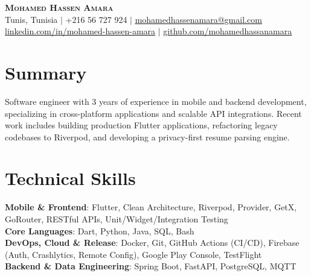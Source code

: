 \documentclass[letterpaper,10pt]{article}
\begin{document}
\begin{center}
    \textbf{\Huge \scshape \textcolor{primaryColor}{Mohamed Hassen Amara}} \\ \vspace{4pt}
    \small
{} Tunis, Tunisia \hspace{1pt}$|$\hspace{1pt}  +216 56 727 924 \hspace{1pt}$|$\hspace{1pt}  \href{mailto:mohamedhassenamara@gmail.com}{\underline{mohamedhassenamara@gmail.com}} \\ \vspace{2pt}
 \href{https://linkedin.com/in/mohamed-hassen-amara}{\underline{linkedin.com/in/mohamed-hassen-amara}} \hspace{1pt}$|$\hspace{1pt}  \href{https://github.com/mohamedhassanamara}{\underline{github.com/mohamedhassanamara}}
\end{center}

\section{Summary}
\small{Software engineer with 3 years of experience in mobile and backend development, specializing in cross-platform applications and scalable API integrations. Recent work includes building production Flutter applications, refactoring legacy codebases to Riverpod, and developing a privacy-first resume parsing engine.}

\section{Technical Skills}
 \begin{itemize}[leftmargin=0pt, label={}, itemsep=1.5pt, topsep=1pt]
    \small{\item{
     \textbf{Mobile \& Frontend}{: Flutter, Clean Architecture, Riverpod, Provider, GetX, GoRouter, RESTful APIs, Unit/Widget/Integration Testing} \\
     \textbf{Core Languages}{: Dart, Python, Java, SQL, Bash} \\
     \textbf{DevOps, Cloud \& Release}{: Docker, Git, GitHub Actions (CI/CD), Firebase (Auth, Crashlytics, Remote Config), Google Play Console, TestFlight} \\
     \textbf{Backend \& Data Engineering}{: Spring Boot, FastAPI, PostgreSQL, MQTT}
    }}
 \end{itemize}
\end{document}
